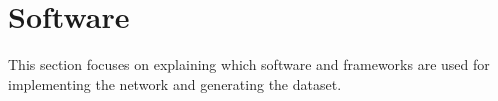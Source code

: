 \section{Software}
This section focuses on explaining which software and frameworks are used for implementing the network and generating the dataset.


